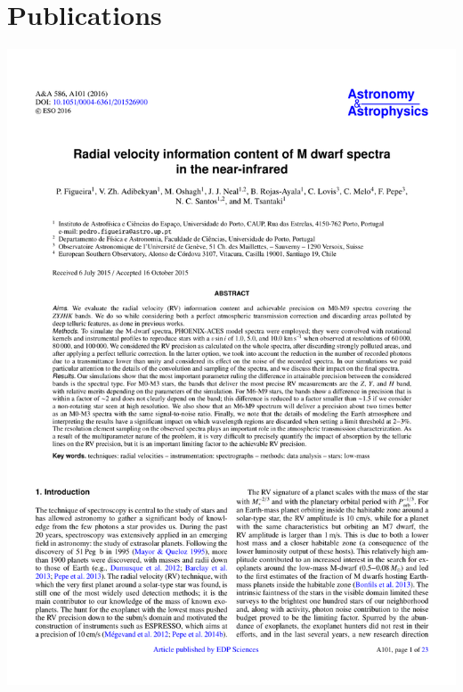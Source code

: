 \section{Publications}	\label{sec:publications}
{\centering
{\includegraphics[width=.9\textwidth,keepaspectratio=true,page = 1, trim = 1cm 1cm 1cm 1cm, clip = true]{appendices/papers/Figueira2016.pdf}}
    
}
